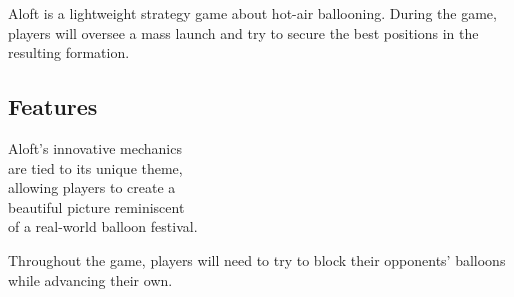\documentclass[a5paper, DIV=18, 12pt]{scrartcl}
\begin{document}
\vspace{-0.5ex}
\flushleft
Aloft is a lightweight strategy game about hot-air ballooning. During the game, players will oversee a mass launch and try to secure the best positions in the resulting formation.
\flushleft
\vspace{-0ex}
\begin{multicols}{2}
\section*{\textcolor{SunriseBlue}{Features}}



Aloft's innovative mechanics\\are tied to its unique theme,\\ allowing players to create a\\beautiful picture reminiscent\\of a real-world balloon festival.
\vspace{1.885ex}

 
Throughout the game, players will need to try to block their opponents' balloons while advancing their own.  \vfill\null\columnbreak

\end{multicols}
\end{document}
